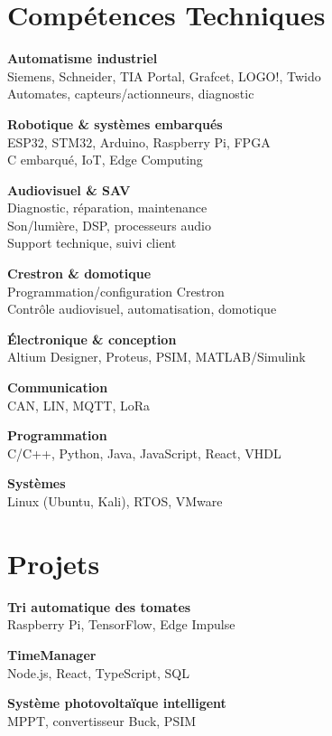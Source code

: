 \documentclass[10pt,a4paper]{article}
\begin{document}
\begin{minipage}[t]{0.33\textwidth}

\section*{Compétences Techniques}

\textbf{Automatisme industriel}\\
Siemens, Schneider, TIA Portal, Grafcet, LOGO!, Twido\\
Automates, capteurs/actionneurs, diagnostic

\textbf{Robotique \& systèmes embarqués}\\
ESP32, STM32, Arduino, Raspberry Pi, FPGA\\
C embarqué, IoT, Edge Computing

\textbf{Audiovisuel \& SAV}\\
Diagnostic, réparation, maintenance\\
Son/lumière, DSP, processeurs audio\\
Support technique, suivi client

\textbf{Crestron \& domotique}\\
Programmation/configuration Crestron\\
Contrôle audiovisuel, automatisation, domotique

\textbf{Électronique \& conception}\\
Altium Designer, Proteus, PSIM, MATLAB/Simulink

\textbf{Communication}\\
CAN, LIN, MQTT, LoRa

\textbf{Programmation}\\
C/C++, Python, Java, JavaScript, React, VHDL

\textbf{Systèmes}\\
Linux (Ubuntu, Kali), RTOS, VMware

\section*{Projets}

\textbf{Tri automatique des tomates}\\
Raspberry Pi, TensorFlow, Edge Impulse

\textbf{TimeManager}\\
Node.js, React, TypeScript, SQL

\textbf{Système photovoltaïque intelligent}\\
MPPT, convertisseur Buck, PSIM


\end{minipage}
\end{document}
